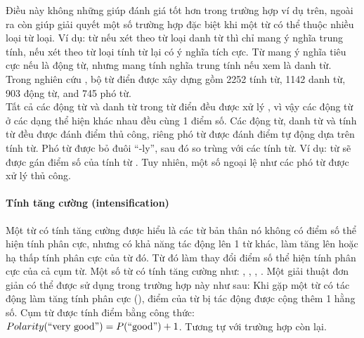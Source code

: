 Điều này không những giúp đánh giá tốt hơn trong trường hợp ví dụ trên, ngoài ra còn giúp giải quyết một số trường hợp đặc biệt khi một từ có thể thuộc nhiều loại từ loại. Ví dụ: từ  nếu xét theo từ loại danh từ thì chỉ mang ý nghĩa trung tính, nếu xét theo từ loại tính từ lại có ý nghĩa tích cực. Từ  mang ý nghĩa tiêu cực nếu là động từ, nhưng mang tính nghĩa trung tính nếu xem là danh từ. Trong nghiên cứu \cite{taboada2011lexicon}, bộ từ điển được xây dựng gồm 2252 tính từ, 1142 danh từ, 903 động từ, and 745 phó từ. \\

Tất cả các động từ và danh từ trong từ điển đều được xử lý , vì vậy các động từ ở các dạng thể hiện khác nhau đều cùng 1 điểm số. Các động từ, danh từ và tính từ đều được đánh điểm thủ công, riêng phó từ được đánh điểm tự động dựa trên tính từ. Phó từ được bỏ đuôi ``-ly'', sau đó so trùng với các tính từ. Ví dụ: từ  sẽ được gán điểm số của tính từ . Tuy nhiên, một số ngoại lệ như các phó từ  được xử lý thủ công. 
\paragraph*{Tính tăng cường (intensification)}
Một từ có tính tăng cường được hiểu là các từ bản thân nó không có điểm số thể hiện tính phân cực, nhưng có khả năng tác động lên 1 từ khác, làm tăng lên hoặc hạ thấp tính phân cực của từ đó. Từ đó làm thay đổi điểm số thể hiện tính phân cực của cả cụm từ. Một số từ có tính tăng cường như: , , , . Một giải thuật đơn giản có thể được sử dụng trong trường hợp này như sau:
Khi gặp một từ có tác động làm tăng tính phân cực (), điểm của từ bị tác động được cộng thêm 1 hằng số. 
Cụm từ  được tính điểm bằng công thức: $Polarity(\text{{``very good''}}) = P(\text{{``good''}}) + 1$.
Tương tự với trường hợp còn lại. \\

